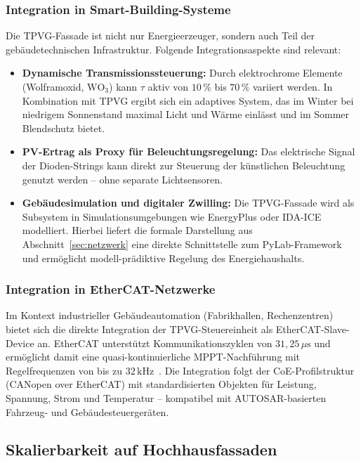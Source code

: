 ﻿\documentclass[a4paper,12pt]{article}
\theoremstyle{definition}
\theoremstyle{remark}
\begin{document}
\subsubsection{Integration in Smart-Building-Systeme}
Die TPVG-Fassade ist nicht nur Energieerzeuger, sondern auch Teil
der gebäudetechnischen Infrastruktur. Folgende Integrationsaspekte
sind relevant:
\begin{itemize}
  \item \textbf{Dynamische Transmissionssteuerung:} Durch
    elektrochrome Elemente (Wolframoxid, $\mathrm{WO_3}$) kann
    $\tau$ aktiv von $10\,\%$ bis $70\,\%$ variiert werden.
    In Kombination mit TPVG ergibt sich ein adaptives System, das
    im Winter bei niedrigem Sonnenstand maximal Licht und Wärme
    einlässt und im Sommer Blendschutz bietet.
  \item \textbf{PV-Ertrag als Proxy für Beleuchtungsregelung:}
    Das elektrische Signal der Dioden-Strings kann direkt zur
    Steuerung der künstlichen Beleuchtung genutzt werden --
    ohne separate Lichtsensoren.
  \item \textbf{Gebäudesimulation und digitaler Zwilling:}
    Die TPVG-Fassade wird als Subsystem in Simulationsumgebungen
    wie EnergyPlus oder IDA-ICE modelliert. Hierbei liefert die
    formale Darstellung aus Abschnitt~\ref{sec:netzwerk} eine
    direkte Schnittstelle zum PyLab-Framework~\cite{Epp2026PyLab}
    und ermöglicht modell-prädiktive Regelung des Energiehaushalts.
\end{itemize}

\subsubsection{Integration in EtherCAT-Netzwerke}
Im Kontext industrieller Gebäudeautomation (Fabrikhallen, Rechenzentren)
bietet sich die direkte Integration der TPVG-Steuereinheit als
EtherCAT-Slave-Device an. EtherCAT unterstützt
Kommunikationszyklen von $31{,}25\,\mu\mathrm{s}$ und ermöglicht
damit eine quasi-kontinuierliche MPPT-Nachführung mit
Regelfrequenzen von bis zu $32\,\mathrm{kHz}$~\cite{Beckhoff2023}.
Die Integration folgt der CoE-Profilstruktur (CANopen over EtherCAT)
mit standardisierten Objekten für Leistung, Spannung, Strom
und Temperatur -- kompatibel mit AUTOSAR-basierten Fahrzeug- und
Gebäudesteuergeräten.

\subsection{Skalierbarkeit auf Hochhausfassaden}
\end{document}
